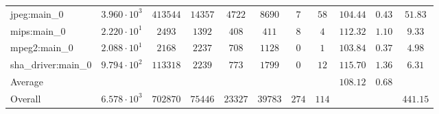 \begin{tabular}{|l|c|c|c|c|c|c|c|c|c|c|}
jpeg:main\_0            & $ 3.960 \cdot 10^{3}  $ & $ 413544 $ & $ 14357 $ & $ 4722  $ & $ 8690  $ & $ 7   $ & $ 58  $ & $ 104.44      $ & $ 0.43    $ & $ 51.83   $ \\
mips:main\_0            & $ 2.220 \cdot 10^{1}  $ & $ 2493   $ & $ 1392  $ & $ 408   $ & $ 411   $ & $ 8   $ & $ 4   $ & $ 112.32      $ & $ 1.10    $ & $ 9.33    $ \\
mpeg2:main\_0           & $ 2.088 \cdot 10^{1}  $ & $ 2168   $ & $ 2237  $ & $ 708   $ & $ 1128  $ & $ 0   $ & $ 1   $ & $ 103.84      $ & $ 0.37    $ & $ 4.98    $ \\
sha\_driver:main\_0     & $ 9.794 \cdot 10^{2}  $ & $ 113318 $ & $ 2239  $ & $ 773   $ & $ 1799  $ & $ 0   $ & $ 12  $ & $ 115.70      $ & $ 1.36    $ & $ 6.31    $ \\
\hline
Average                 & $                     $ & $        $ & $       $ & $       $ & $       $ & $     $ & $     $ & $ 108.12      $ & $ 0.68    $ & $         $ \\
\hline
Overall                 & $ 6.578 \cdot 10^{3}  $ & $ 702870 $ & $ 75446 $ & $ 23327 $ & $ 39783 $ & $ 274 $ & $ 114 $ & $             $ & $         $ & $ 441.15  $ \\
\hline
\end{tabular}
